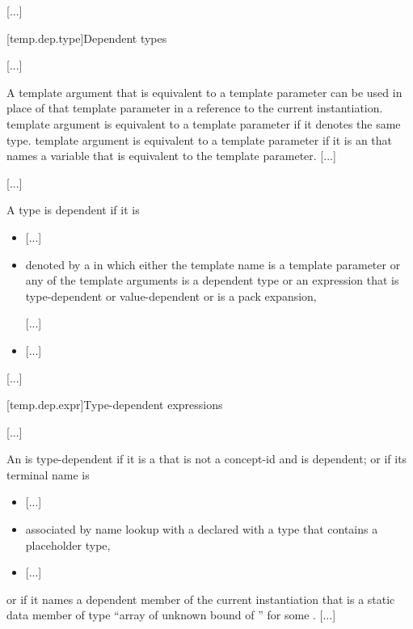 \documentclass{wg21}
\begin{document}
\textcolor{noteclr}{[...]}

[temp.dep.type]{Dependent types}

\textcolor{noteclr}{[...]}

\pnum
A template argument that is equivalent to a template
parameter can be used in place of that
template parameter in a reference to the current instantiation.
 template argument is equivalent to a  template parameter
if it denotes the same type.
 template argument is equivalent to a  template parameter
if it is an  that names a variable
that is equivalent to the template parameter.
\textcolor{noteclr}{[...]}

\textcolor{noteclr}{[...]}

\pnum
A type is dependent if it is
\begin{itemize}
\item
\textcolor{noteclr}{[...]}
\item
denoted by a 
in which either the template name is a template parameter or any of the
template arguments  is a dependent type or an expression that is type-dependent
or value-dependent or is a pack expansion,
\begin{wfootnote}
    \textcolor{noteclr}{[...]}
\end{wfootnote}
\item \textcolor{noteclr}{[...]}
\end{itemize}

\textcolor{noteclr}{[...]}

[temp.dep.expr]{Type-dependent expressions}

\textcolor{noteclr}{[...]}

\pnum
An  is type-dependent
if it is a  that is not a concept-id and is dependent;
or if its terminal name is
\begin{itemize}
\item
\textcolor{noteclr}{[...]}
\item
associated by name lookup with
a 
declared with a type
that contains a placeholder type,
\item
\textcolor{noteclr}{[...]}
\end{itemize}
or if it names a dependent member of the current instantiation that is a static
data member of type
``array of unknown bound of '' for some .
\textcolor{noteclr}{[...]}
\end{document}
